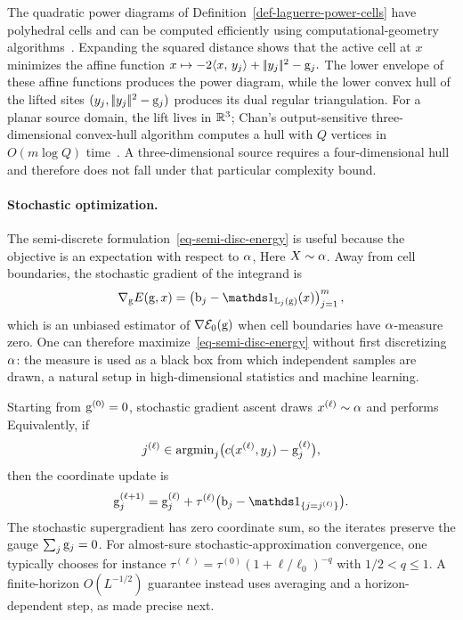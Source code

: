 The quadratic power diagrams of Definition~\ref{def-laguerre-power-cells} have polyhedral cells and can be computed efficiently using computational-geometry algorithms~\cite{aurenhammer1987power,AurenhammerHA98,Merigot11}. Expanding the squared distance shows that the active cell at $x$ minimizes the affine function
\(
x\mapsto -2\langle x,\,y_j\rangle+|\!| y_j |\!|^2-\mathrm{g}_j.
\)
The lower envelope of these affine functions produces the power diagram, while the lower convex hull of the lifted sites $(y_j,|\!| y_j |\!|^2-\mathrm{g}_j)$ produces its dual regular triangulation. For a planar source domain, the lift lives in $\mathbb{R}^3$; Chan's output-sensitive three-dimensional convex-hull algorithm computes a hull with $Q$ vertices in $O(m\log Q)$ time~\cite{chan1996optimal}. A three-dimensional source requires a four-dimensional hull and therefore does not fall under that particular complexity bound.

\paragraph{Stochastic optimization.}

The semi-discrete formulation~\eqref{eq-semi-disc-energy} is useful because the objective is an expectation with respect to $\alpha$,
Here $X\sim\alpha$. Away from cell boundaries, the stochastic gradient of the integrand is
\[
	\nabla_{\gD}E(\gD,x)
	=
	\left(\b_j-\ones_{\Laguerre_j(\gD)}(x)\right)_{j=1}^m,
\]
which is an unbiased estimator of $\nabla\mathcal{E}_0(\mathrm{g})$ when cell boundaries have $\alpha$-measure zero. One can therefore maximize~\eqref{eq-semi-disc-energy} without first discretizing $\alpha$: the measure is used as a black box from which independent samples are drawn, a natural setup in high-dimensional statistics and machine learning.

Starting from $\mathrm{g}^{(0)}=0$, stochastic gradient ascent draws $x^{(\ell)}\sim\alpha$ and performs
Equivalently, if
\[
	j^{(\ell)}\in\operatorname{argmin}_j\bigl(c(x^{(\ell)},y_j)-\mathrm{g}_j^{(\ell)}\bigr),
\]
then the coordinate update is
\[
	\gD_j^{(\ell+1)}
	=
	\gD_j^{(\ell)}
	+
	\tau^{(\ell)}\bigl(\b_j-\ones_{\{j=j^{(\ell)}\}}\bigr).
\]
The stochastic supergradient has zero coordinate sum, so the iterates preserve the gauge $\sum_j\mathrm{g}_j=0$. For almost-sure stochastic-approximation convergence, one typically chooses
for instance $\tau^{(\ell)}=\tau^{(0)}(1+\ell/\ell_0)^{-q}$ with $1/2<q\leq1$. A finite-horizon $O(L^{-1/2})$ guarantee instead uses averaging and a horizon-dependent step, as made precise next.


